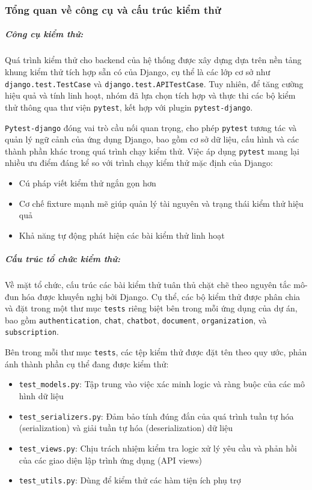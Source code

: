 \subsubsection{Tổng quan về công cụ và cấu trúc kiểm thử}

\subparagraph{Công cụ kiểm thử: } 



Quá trình kiểm thử cho backend của hệ thống được xây dựng dựa trên nền tảng khung kiểm thử tích hợp sẵn có của Django, cụ thể là các lớp cơ sở như \texttt{django.test.TestCase} và \texttt{django.test.APITestCase}. Tuy nhiên, để tăng cường hiệu quả và tính linh hoạt, nhóm đã lựa chọn tích hợp và thực thi các bộ kiểm thử thông qua thư viện \texttt{pytest}, kết hợp với plugin \texttt{pytest-django}. 

\texttt{Pytest-django} đóng vai trò cầu nối quan trọng, cho phép \texttt{pytest} tương tác và quản lý ngữ cảnh của ứng dụng Django, bao gồm cơ sở dữ liệu, cấu hình và các thành phần khác trong quá trình chạy kiểm thử. Việc áp dụng \texttt{pytest} mang lại nhiều ưu điểm đáng kể so với trình chạy kiểm thử mặc định của Django:
\begin{itemize}
    \item Cú pháp viết kiểm thử ngắn gọn hơn
    \item Cơ chế fixture mạnh mẽ giúp quản lý tài nguyên và trạng thái kiểm thử hiệu quả
    \item Khả năng tự động phát hiện các bài kiểm thử linh hoạt
\end{itemize}

\subparagraph{Cấu trúc tổ chức kiểm thử: } 



Về mặt tổ chức, cấu trúc các bài kiểm thử tuân thủ chặt chẽ theo nguyên tắc mô-đun hóa được khuyến nghị bởi Django. Cụ thể, các bộ kiểm thử được phân chia và đặt trong một thư mục \texttt{tests} riêng biệt bên trong mỗi ứng dụng của dự án, bao gồm \texttt{authentication}, \texttt{chat}, \texttt{chatbot}, \texttt{document}, \texttt{organization}, và \texttt{subscription}.

Bên trong mỗi thư mục \texttt{tests}, các tệp kiểm thử được đặt tên theo quy ước, phản ánh thành phần cụ thể đang được kiểm thử:
\begin{itemize}
    \item \texttt{test\_models.py}: Tập trung vào việc xác minh logic và ràng buộc của các mô hình dữ liệu
    \item \texttt{test\_serializers.py}: Đảm bảo tính đúng đắn của quá trình tuần tự hóa (serialization) và giải tuần tự hóa (deserialization) dữ liệu
    \item \texttt{test\_views.py}: Chịu trách nhiệm kiểm tra logic xử lý yêu cầu và phản hồi của các giao diện lập trình ứng dụng (API views)
    \item \texttt{test\_utils.py}: Dùng để kiểm thử các hàm tiện ích phụ trợ
\end{itemize}

